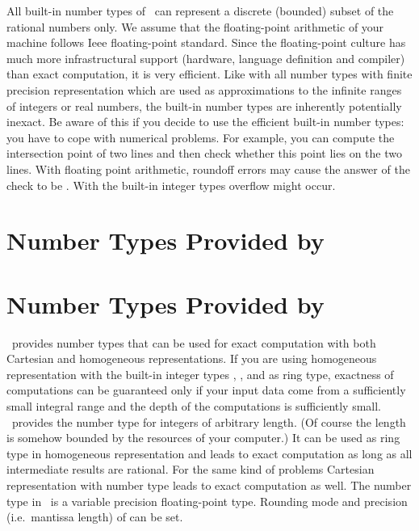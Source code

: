 All built-in number types of \CC\ can represent a discrete (bounded)
subset of the rational numbers only.  We assume that the
floating-point arithmetic of your machine follows {\sc Ieee}
floating-point standard.  Since the floating-point culture has much
more infrastructural support (hardware, language definition and
compiler) than exact computation, it is very efficient.
Like with all number types with finite precision representation
which are used as approximations to the infinite ranges of 
integers or real numbers, the built-in number types are inherently
potentially inexact.
Be aware of this if you decide to use the efficient built-in 
number types: you have to cope with numerical problems.  
For example, you can compute the intersection point of two lines and 
then check whether this point lies on the two lines. 
With floating point arithmetic,
roundoff errors may cause the answer of the check to be . 
With the built-in integer types overflow might occur.

\section{Number Types Provided by \cgal}











\section{Number Types Provided by \leda}
\label{leda-nt}

\leda\ provides number types that can be used for exact computation 
with both Cartesian and homogeneous representations.  If you are using
homogeneous representation with the built-in integer types
, , and  as ring type, exactness of
computations can be guaranteed only if your input data come from a
sufficiently small integral range and the depth of the computations is
sufficiently small.  \leda\ provides the number type  for
integers of arbitrary length. (Of course the length is
somehow bounded by the resources of your computer.)  It can be used as
ring type in homogeneous representation and leads to exact
computation as long as all intermediate results are rational.  For the
same kind of problems Cartesian representation with number type
 leads to exact computation as well.
The number type  in \leda\ is a variable precision
floating-point type. Rounding mode and precision (i.e.\ mantissa length) of
 can be set. 

